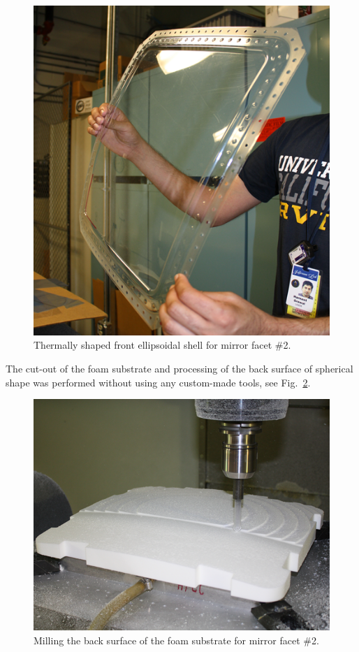 \begin{figure}[ht]
    \centering
    \includegraphics[width=0.90\linewidth]{images/Front_Shell.png}
    \caption{Thermally shaped front ellipsoidal shell for mirror facet \#2.}
    \label{fig:Shell}
\end{figure}

The cut-out of the foam substrate and processing of the back surface of spherical shape was performed without
using any custom-made tools, see Fig.~\ref{fig:Cut_Substr}.
\begin{figure}[ht]
    \centering
    \includegraphics[width=0.9\linewidth]{images/Cut_Substr.png}
    \caption{Milling the back surface of the foam substrate for mirror facet \#2.}
    \label{fig:Cut_Substr}
\end{figure}

